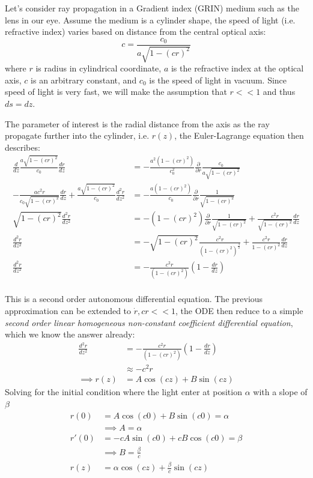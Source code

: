 \documentclass[%
 amsmath,amssymb,
aps,
 fleqn,
 notitlepage,
]{revtex4-2}
\begin{document}
Let's consider ray propagation in a Gradient index (GRIN) medium such as the lens in our eye. Assume the medium is a cylinder shape, the speed of light (i.e. refractive index) varies based on distance from the central optical axis:
\[c = \frac{c_0}{a\sqrt{1-(cr)^2}}\]
where $r$ is radius in cylindrical coordinate, $a$ is the refractive index at the optical axis, $c$ is an arbitrary constant, and $c_0$ is the speed of light in vacuum. Since speed of light is very fast, we will make the assumption that $r << 1$ and thus $ds = dz$.

The parameter of interest is the radial distance from the axis as the ray propagate further into the cylinder, i.e. $r(z)$, the Euler-Lagrange equation then describes:
\begin{align*}
    \frac{d}{dz} \frac{a\sqrt{1-(cr)^2}}{c_0}\frac{d r}{dz} &= -\frac{a^2(1-(cr)^2)}{c_0^2}\frac{\partial}{\partial r} \frac{c_0}{a\sqrt{1-(cr)^2}}\\
    - \frac{ac^2 r}{c_0\sqrt{1-(cr)^2}}\frac{dr}{dz}+\frac{a\sqrt{1-(cr)^2}}{c_0}\frac{d^2 r}{dz^2} &= -\frac{a(1-(cr)^2)}{c_0}\frac{\partial}{\partial r} \frac{1}{\sqrt{1-(cr)^2}}\\
    \sqrt{1-(cr)^2}\frac{d^2 r}{dz^2} &= -(1-(cr)^2)\frac{\partial}{\partial r} \frac{1}{\sqrt{1-(cr)^2}} + \frac{c^2 r}{\sqrt{1-(cr)^2}}\frac{dr}{dz}\\
    \frac{d^2 r}{dz^2} &= -\sqrt{1-(cr)^2} \frac{c^2r}{(1-(cr)^2)^{\frac{3}{2}}}+ \frac{c^2 r}{{1-(cr)^2}}\frac{dr}{dz}\\
    \frac{d^2 r}{dz^2} &= -\frac{c^2r}{(1-(cr)^2)}\left(1-\frac{dr}{dz}\right)\\
\end{align*}

This is a second order autonomous differential equation. The previous approximation can be extended to $\dot{r},cr<<1$, the ODE then reduce to a simple \textit{second order linear homogeneous non-constant coefficient differential equation}, which we know the answer already:
\begin{align*}
    \frac{d^2 r}{dz^2} &= -\frac{c^2r}{(1-(cr)^2)}\left(1-\frac{dr}{dz}\right)\\
    &\approx -c^2 r\\
    \implies r(z) &= A\cos(cz)+B\sin(cz)
\end{align*}
Solving for the initial condition where the light enter at position $\alpha$ with a slope of $\beta$
\begin{align*}
    r(0) &= A\cos(c0)+B\sin(c0) = \alpha \\
    &\implies A = \alpha\\
    r'(0) &= -cA\sin(c0)+cB\cos(c0) = \beta \\
    &\implies B = \frac{\beta}{c}\\
    r(z) &= \alpha\cos(cz)+\frac{\beta}{c}\sin(cz)
\end{align*}
\end{document}
